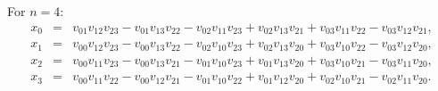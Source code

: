 \documentclass[12pt]{article}
\begin{document}
For $n = 4$:
\begin{eqnarray}
x_{0} &=& 
   v_{01} v_{12} v_{23}
 - v_{01} v_{13} v_{22}
 - v_{02} v_{11} v_{23}
 + v_{02} v_{13} v_{21}
 + v_{03} v_{11} v_{22}
 - v_{03} v_{12} v_{21},\\
x_{1} &=& 
    v_{00} v_{12} v_{23}
  - v_{00} v_{13} v_{22}
 - v_{02} v_{10} v_{23}
 + v_{02} v_{13} v_{20}
  + v_{03} v_{10} v_{22}
  - v_{03} v_{12} v_{20},\\
x_{2} &=& 
v_{00} v_{11} v_{23}
- v_{00} v_{13} v_{21}
  - v_{01} v_{10} v_{23}
  + v_{01} v_{13} v_{20}
  + v_{03} v_{10} v_{21}
  - v_{03} v_{11} v_{20},\\
x_{3} &=& 
   v_{00} v_{11} v_{22}
 - v_{00} v_{12} v_{21}
 - v_{01} v_{10} v_{22}
 + v_{01} v_{12} v_{20}
 + v_{02} v_{10} v_{21}
 - v_{02} v_{11} v_{20}.
\end{eqnarray}










\end{document}
